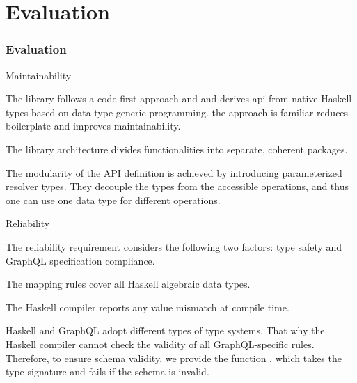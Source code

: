 \section{Evaluation}

\begin{frame}[allowframebreaks]\frametitle{Evaluation}

\begin{block}{Maintainability}

  \begin{itemize}
  
     The library follows a code-first approach and and derives api from native Haskell types based on data-type-generic programming. the approach is familiar reduces boilerplate and improves maintainability.

      The library architecture divides functionalities into separate, coherent packages. 
    
      The modularity of the API definition is achieved by introducing parameterized resolver types. They decouple the types from the accessible operations, and thus one can use one data type for different operations.

  \end{itemize}

\end{block}


\begin{block}{Reliability}

The reliability requirement considers the following two factors: type safety and GraphQL specification compliance.

\begin{itemize}

    \begin{enumerate}

       The mapping rules cover all Haskell algebraic data types.

       The Haskell compiler reports any value mismatch at compile time.
      
       Haskell and GraphQL adopt different types of type systems. That why the Haskell compiler cannot check the validity of all GraphQL-specific rules. Therefore, to ensure schema validity, we provide the function , which takes the  type signature and fails if the schema is invalid.
    

\end{enumerate}
\end{itemize}
\end{block}
\end{frame}
